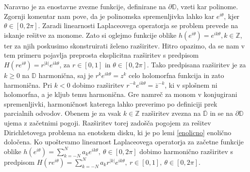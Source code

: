 \documentclass[mat1, tisk]{fmfdelo}
\begin{document}
    Naravno je za enostavne zvezne funkcije, definirane na $\partial \mathbb{D}$, vzeti kar polinome. Zgornji komentar nam pove, da je polinomska spremenljivka lahko kar $e^{i\theta}$, kjer \mbox{$\theta \in [0,2\pi]$}. 
    Zaradi linearnosti Laplaceovega operatorja se problem prevede na iskanje rešitve za monome. 
    Zato si oglejmo funkcije oblike $h(e^{i \theta}) = e^{i k \theta}, k \in \mathbb{Z}$, ter za njih poskusimo skonstruirati želeno razširitev. 
    Hitro opazimo, da se nam v tem primeru pojavlja preprosta eksplicitna razširitev s predpisom $H(r e^{i \theta}) = r^{|k|}e^{i k \theta}$, za \mbox{$r \in [0, 1]$} in $\theta \in [0, 2\pi]$. 
    Tako predpisana razširitev je za $k \geq 0$ na $\mathbb{D}$ harmonična, saj je $r^k e^{ik\theta} = z^k$ celo holomorfna funkcija in zato harmonična. Pri $k < 0$ dobimo razširitev $r^{-k} e^{ik\theta} = \overline{z}^{-k}$, ki v splošnem ni holomorfna, a je \mbox{kljub} temu harmonična. 
    Gre namreč za monom v konjugirani spremenljivki, harmoničnost katerega lahko preverimo po definiciji prek parcialnih odvodov.
    Obenem je za vsak $k \in \mathbb{Z}$ razširitev zvezna na $\overline{\mathbb{D}}$ in se na $\partial \mathbb{D}$ ujema z začetnimi pogoji. Razširitev torej zadošča pogojem za rešitev Dirichletovega problema na enotskem disku, ki je po lemi \ref{enolicno} enolično določena. 
    Ko upoštevamo linearnost Laplaceovega operatorja za začetne funkcije oblike $h(e^{i\theta}) = \sum_{k = -N}^{N}{a_k e^{ik\theta}},~\theta \in [0,2\pi]$ dobimo harmonično razširitev s predpisom
    $H(r e^{i \theta}) = \sum_{k = -N}^{N}{a_k r^{|k|}e^{ik\theta}},~r \in [0,1],~\theta \in [0,2\pi]$. 
    
\end{document}
